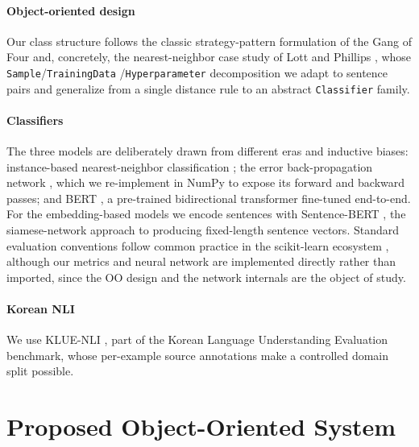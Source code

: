 \documentclass[conference]{IEEEtran}
\begin{document}
\paragraph*{Object-oriented design}
Our class structure follows the classic strategy-pattern formulation of
the Gang of Four \cite{gamma1994design} and, concretely, the
nearest-neighbor case study of Lott and Phillips
\cite{lott2021python}, whose \texttt{Sample}/\texttt{TrainingData}
/\texttt{Hyperparameter} decomposition we adapt to sentence pairs and
generalize from a single distance rule to an abstract
\texttt{Classifier} family.

\paragraph*{Classifiers}
The three models are deliberately drawn from different eras and
inductive biases: instance-based nearest-neighbor classification
\cite{cover1967nearest}; the error back-propagation network
\cite{rumelhart1986learning}, which we re-implement in NumPy to expose
its forward and backward passes; and BERT \cite{devlin2019bert}, a
pre-trained bidirectional transformer fine-tuned end-to-end. For the
embedding-based models we encode sentences with Sentence-BERT
\cite{reimers2019sentence}, the siamese-network approach to producing
fixed-length sentence vectors. Standard evaluation conventions follow
common practice in the scikit-learn ecosystem \cite{pedregosa2011scikit},
although our metrics and neural network are implemented directly rather
than imported, since the OO design and the network internals are the
object of study.

\paragraph*{Korean NLI}
We use KLUE-NLI \cite{park2021klue}, part of the Korean Language
Understanding Evaluation benchmark, whose per-example source annotations
make a controlled domain split possible.

\section{Proposed Object-Oriented System}
\label{sec:system}
\end{document}
